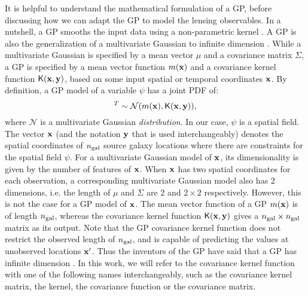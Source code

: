 It is helpful to understand the mathematical formulation of a GP, 
before discussing how we can adapt the GP to model the lensing observables. 
In a nutshell, a GP smooths the input data using a non-parametric kernel
\citep{Hastie1990}. 
A GP is also the generalization of a multivariate Gaussian 
to infinite dimension \citep{Rasmussen2006}. While a multivariate Gaussian is
specified by a mean vector $\mu$ and a covariance matrix $\Sigma$, 
a GP is specified by a mean vector function $m(\mathbf{x})$ and a
covariance kernel function $\mathsf{K}(\mathbf{x}, \mathbf{y})$, based on some input spatial or
temporal coordinates $\mathbf{x}$. 
By definition, a GP model of a variable $\psi$ has a joint
PDF of:
\begin{equation}
	[\psi_1, \psi_2, \ldots, \psi_m ]^T \sim \mathcal{N}(m(\xv),
	\kerngp(\xv, \yv)),\label{eq:GP_joint_distribution}
\end{equation}
where $\mathcal{N}$ is a multivariate Gaussian {\it distribution}.
In our case, $\psi$ is a spatial field. The vector $\mathbf{x}$ (and the
notation $\mathbf{y}$ that is used interchangeably) denotes the
spatial coordinates of $n_{\rm gal}$ source galaxy locations where there are
constraints for the spatial field $\psi$. 
For a multivariate Gaussian model of $\mathbf{x}$, 
its dimensionality is given by the number of features of $\mathbf{x}$.
When $\mathbf{x}$ has two spatial coordinates for each observation, 
a corresponding multivariate Gaussian model also has 2 dimensions, 
i.e. the length of $\mu$ and $\Sigma$ are 2 and $2 \times 2$ respectively. 
However, this is not the case for a GP model of $\mathbf{x}$. 
The mean vector function of a GP $m(\mathbf{x})$ is of length $n_{\rm gal}$, 
whereas the covariance kernel function $\mathsf{K}(\mathbf{x}, \mathbf{y})$
gives a $n_{\rm gal} \times n_{\rm gal}$ matrix as its output.
Note that the GP covariance kernel function does not restrict the 
observed length of $n_{\rm gal}$, and is capable of predicting the values at
unobserved locations $\mathbf{x}'$. Thus the inventors of the GP 
have said that a GP has infinite dimension \citep{Rasmussen2006}. 
In this work, we will refer to the covariance kernel function with one of 
the following names interchangeably, such as the 
covariance kernel matrix, the kernel, the covariance
function or the covariance matrix. 


